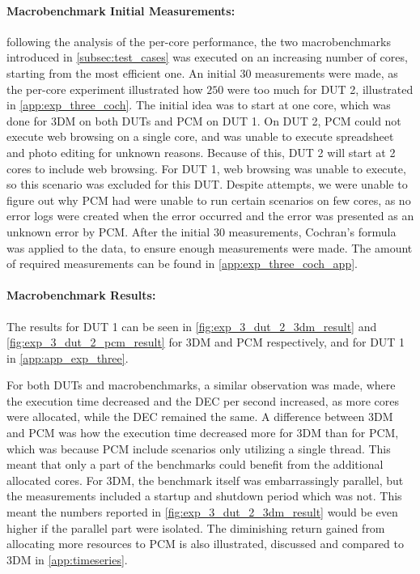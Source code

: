 \paragraph*{Macrobenchmark Initial Measurements:} following the analysis of the per-core performance, the two macrobenchmarks introduced in \cref{subsec:test_cases} was executed on an increasing number of cores, starting from the most efficient one. An initial $30$ measurements were made, as the per-core experiment illustrated how $250$ were too much for DUT 2, illustrated in \cref{app:exp_three_coch}. The initial idea was to start at one core, which was done for 3DM on both DUTs and PCM on DUT 1. On DUT 2, PCM could not execute web browsing on a single core, and was unable to execute spreadsheet and photo editing for unknown reasons. Because of this, DUT 2 will start at 2 cores to include web browsing. For DUT 1, web browsing was unable to execute, so this scenario was excluded for this DUT. Despite attempts, we were unable to figure out why PCM had were unable to run certain scenarios on few cores, as no error logs were created when the error occurred and the error was presented as an unknown error by PCM. After the initial $30$ measurements, Cochran's formula was applied to the data, to ensure enough measurements were made. The amount of required measurements can be found in \cref{app:exp_three_coch_app}.


\paragraph*{Macrobenchmark Results:} The results for DUT 1 can be seen in \cref{fig:exp_3_dut_2_3dm_result} and \cref{fig:exp_3_dut_2_pcm_result} for 3DM and PCM respectively, and for DUT 1 in \cref{app:app_exp_three}.



For both DUTs and macrobenchmarks, a similar observation was made, where the execution time decreased and the DEC per second increased, as more cores were allocated, while the DEC remained the same. A difference between 3DM and PCM was how the execution time decreased more for 3DM than for PCM, which was because PCM include scenarios only utilizing a single thread. This meant that only a part of the benchmarks could benefit from the additional allocated cores. For 3DM, the benchmark itself was embarrassingly parallel, but the measurements included a startup and shutdown period which was not. This meant the numbers reported in \cref{fig:exp_3_dut_2_3dm_result} would be even higher if the parallel part were isolated. The diminishing return gained from allocating more resources to PCM is also illustrated, discussed and compared to 3DM in \cref{app:timeseries}.

